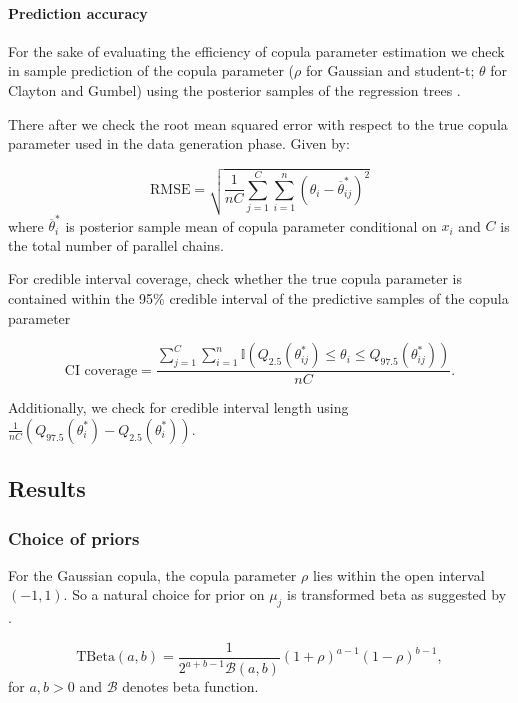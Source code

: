 \documentclass{amsart}
\begin{document}
\paragraph{Prediction accuracy} For the sake of evaluating the efficiency of copula parameter estimation we check in sample prediction of the copula parameter ($\rho$ for Gaussian and student-t; $\theta$ for Clayton and Gumbel) using the posterior samples of the regression trees . 

There after we check the root mean squared error with respect to the true copula parameter used in the data generation phase. Given by:

\begin{equation}
	\text{RMSE} = \sqrt{\frac{1}{nC}\sum_{j=1}^C \sum_{i=1}^n (\theta_{i} - \overline{\theta}^*_{ij})^2}
\end{equation}
where $\overline{\theta}^*_i$ is posterior sample mean of copula parameter conditional on $x_i$ and $C$ is the total number of parallel chains.

For credible interval coverage, check whether the true copula parameter is contained within the 95\% credible interval of the predictive samples of the copula parameter

\begin{equation}
	\text{CI coverage} = \frac{\sum_{j=1}^C\sum_{i=1}^n\mathbb{I}\left(Q_{2.5}(\theta^*_{ij}) \le \theta_i \le Q_{97.5}(\theta^*_{ij})\right)}{nC}.
\end{equation}

Additionally, we check for credible interval length using $\frac{1}{nC}\left(Q_{97.5}(\theta^*_i) - Q_{2.5}(\theta^*_i)\right)$.

\subsection{Results}

\subsubsection{Choice of priors} For the Gaussian copula, the copula parameter $\rho$ lies within the open interval $(-1,1)$. So a natural choice for prior on $\mu_j$ is transformed beta as suggested by \citet{gokhale_prior_cor}. 

\begin{equation}
	\text{TBeta}(a, b) = \frac{1}{2^{a+b-1}\mathcal{B}(a,b)}(1+\rho)^{a-1}(1-\rho)^{b-1},
\end{equation}
for $a,b>0$ and $\mathcal{B}$ denotes beta function. 
\end{document}
